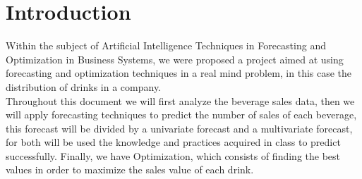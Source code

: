 \newapge

\section{Introduction}

\quad Within the subject of Artificial Intelligence Techniques in Forecasting and Optimization in Business Systems, we were proposed a project aimed at using forecasting and optimization techniques in a real mind problem, in this case the distribution of drinks in a company. \\


Throughout this document we will first analyze the beverage sales data, then we will apply forecasting techniques to predict the number of sales of each beverage, this forecast will be divided by a univariate forecast and a multivariate forecast, for both will be used the knowledge and practices acquired in class to predict successfully. Finally, we have Optimization, which consists of finding the best values in order to maximize the sales value of each drink.
